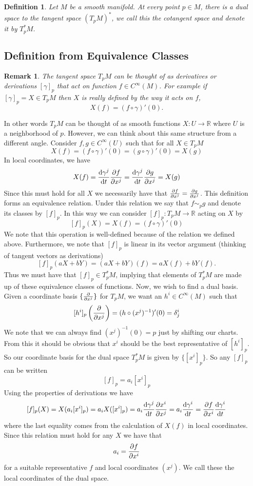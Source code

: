\documentclass[a4paper]{article}
\newtheorem*{defn}{Definition}
\newtheorem*{rem}{Remark}
\begin{document}
\begin{defn}
  Let $M$ be a smooth manifold. At every point $p \in M$, there is a dual space to the tangent space $(T_pM)^*$, we call this the cotangent space and denote it by $T_p^*M$.
\end{defn}

\subsection*{Definition from Equivalence Classes}%

\begin{rem}
  The tangent space $T_pM$ can be thought of as derivatives or derivations $[\gamma]_p$ that act on function $f \in C^{\infty}(M)$. For example if $[\gamma]_p = X \in T_pM$ then $X$ is really defined by the way it acts on $f$, 
  \[
    X(f) = (f \circ \gamma)'(0).
  \]
\end{rem}
In other words $T_pM$ can be thought of as smooth functions $X: U \rightarrow \mathds{R}$ where $U$ is a neighborhood of $p$. However, we can think about this same structure from a different angle. Consider $f,g \in C^{\infty}(U)$ such that for all $X \in T_pM$
  \[
    X(f) = (f \circ \gamma)'(0) = (g \circ \gamma)'(0) = X(g)
  \]
  In local coordinates, we have
  \[
    X(f) = \dv{\gamma^j}{t} \pdv{f}{x^j} = \dv{\gamma^j}{t} \pdv{g}{x^j} = X(g)
  \]
  Since this must hold for all $X$ we necessarily have that $\pdv{f}{x^j} = \pdv{g}{x^j}$. This definition forms an equivalence relation. Under this relation we say that $f \sim_p g$ and denote its classes by $[f]_p$. In this way we can consider $[f]_p: T_pM \rightarrow \mathds{R}$ acting on $X$ by
  \[
    [f]_p(X) = X(f) = (f \circ \gamma)'(0)
  \]
  We note that this operation is well-defined because of the relation we defined above. Furthermore, we note that $[f]_p$ is linear in its vector argument (thinking of tangent vectors as derivations)
  \[
    [f]_p(a X + bY) = (a X + b Y)(f) = aX(f) + bY(f).
  \]
  Thus we must have that $[f]_p \in T_p^*M$, implying that elements of $T_p^*M$ are made up of these equivalence classes of functions. Now, we wish to find a dual basis. Given a coordinate basis $\{ \pdv{x^j}\}$ for $T_pM$, we want an $h^i \in C^{\infty}(M)$ such that
  \[
    [h^i]_p \left( \pdv{x^j} \right) = (h \circ (x^j)^{-1})'(0) = \delta^i_j
  \]
  We note that we can always find $(x^j)^{-1}(0) = p$ just by shifting our charts. From this it should be obvious that $x^i$ should be the best representative of $[h^i]_p$. So our coordinate basis for the dual space $T_p^*M$ is given by $\{[x^i]_p\}$. So any $[f]_p$ can be written
  \[
    [f]_p = a_i [x^i]_p
  \]
  Using the properties of derivations we have
  \[
    [f]_p(X) = X(a_i[x^i]_p) = a_i X([x^i]_p) = a_i \dv{\gamma^j}{t} \pdv{x^i}{x^j} = a_i \dv{\gamma^i}{t} = \pdv{f}{x^i} \dv{\gamma^i}{t}
  \]
  where the last equality comes from the calculation of $X(f)$ in local coordinates. Since this relation must hold for any $X$ we have that
  \[
    a_i = \pdv{f}{x^i}
  \]
  for a suitable representative $f$ and local coordinates $(x^j)$. We call these the local coordinates of the dual space.
  
\end{document}
